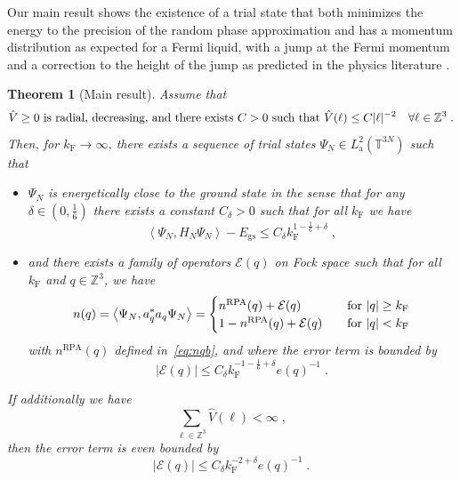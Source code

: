 \documentclass[12pt,a4paper]{article}
\numberwithin{equation}{section}
\newcommand{\cE}{\mathcal{E}}
\newcommand{\1}{\mathbb{I}}
\newcommand{\F}{\mathrm{F}}
\newcommand{\GS}{\mathrm{gs}}
\newcommand{\RPA}{\mathrm{RPA}}
\newcommand{\kF}{k_\F}
\newcommand{\Zstar}{\mathbb{Z}^3} %
\newcommand{\Z}{\mathbb{Z}}
\newcommand{\T}{\mathbb{T}}
\newcommand{\eva}[1]{\left\langle #1 \right\rangle}
\theoremstyle{plain}
\newtheorem{theorem}{Theorem}[section]
\theoremstyle{definition}
\theoremstyle{remark}
\theoremstyle{plain}
\theoremstyle{definition}
\theoremstyle{remark}
\begin{document}
Our main result shows the existence of a trial state that both minimizes the energy to the precision of the random phase approximation and has a momentum distribution as expected for a Fermi liquid, with a jump at the Fermi momentum and a correction to the height of the jump as predicted in the physics literature \cite{DV60}.

\begin{theorem}[Main result] \label{thm:main}
Assume that
\begin{equation} \label{hyp:Coulomb}
\hat{V} \ge 0 \text{ is radial, decreasing, and there exists $ C > 0 $ such that }
 \hat{V}(\ell) \le C |\ell|^{-2} \quad \forall \ell \in \Z^3\;.
\end{equation}
Then, for $\kF \to \infty $, there exists a sequence of trial states  $ \Psi_N \in L^2_{\mathrm{a}}(\T^{3N}) $ such that
\begin{itemize}
\item $ \Psi_N $ is energetically close to the ground state in the sense that for any $ \delta \in (0,\frac{1}{6}) $ there exists a constant $ C_\delta > 0 $ such that for all $k_\F$ we have
\begin{equation} \label{eq:main1}
	\eva{\Psi_N, H_N \Psi_N} - E_{\GS}
	\le C_\delta \kF^{1-\frac 16 + \delta} \;,
\end{equation}
\item and there exists a family of operators $\mathcal{E}(q)$ on Fock space such that for all $ \kF $ and $ q \in \Z^3 $, we have
\begin{equation} \label{eq:main2}
	n(q) = \eva{\Psi_N, a_q^* a_q \Psi_N}
	= \begin{cases}
	n^{\RPA}(q) + \cE(q) & \quad
		\textnormal{for } |q| \ge \kF \\
	1 - n^{\RPA}(q) + \cE(q) & \quad
		\textnormal{for } |q| < \kF
	\end{cases}
\end{equation}
with $ n^{\RPA}(q) $ defined in~\eqref{eq:nqb}, and where the error term is bounded by
\begin{equation}\label{eq:main_error}
	\lvert \cE(q)\rvert \le C_\delta \kF^{-1 - \frac 16 + \delta} e(q)^{-1} \;.
\end{equation}
\end{itemize}
If additionally we have
\begin{equation}\label{hyp:ell1}
   \sum_{\ell \in \Zstar} \hat{V}(\ell) < \infty\;,
\end{equation}
then the error term is even bounded by
\begin{equation} \label{eq:main_improvederror}
	\lvert \cE(q)\rvert \le C_\delta \kF^{-2 +\delta} e(q)^{-1} \;.
\end{equation}
\end{theorem}
\end{document}
